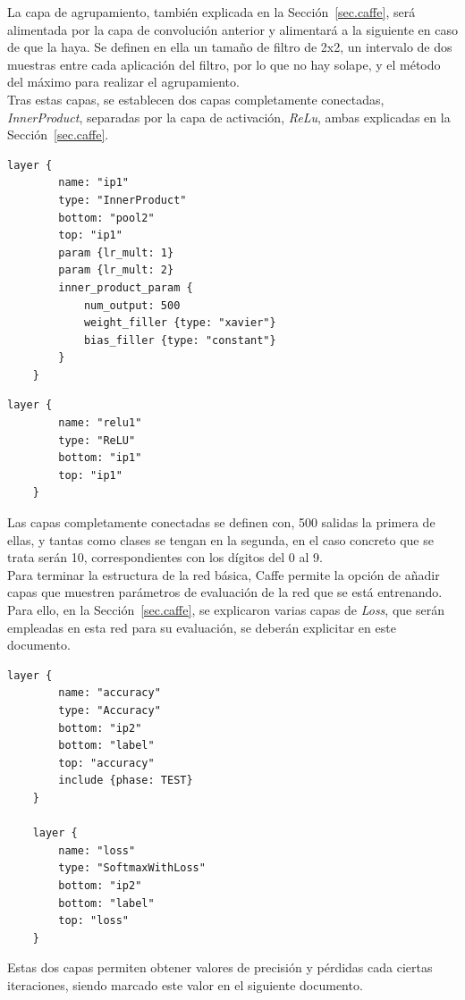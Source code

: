 	La capa de agrupamiento, también explicada en la Sección~\ref{sec.caffe}, será alimentada por la capa de convolución anterior y alimentará a la siguiente en caso de que la haya. Se definen en ella un tamaño de filtro de 2x2, un intervalo de dos muestras entre cada aplicación del filtro, por lo que no hay solape, y el método del máximo para realizar el agrupamiento.\\

	Tras estas capas, se establecen dos capas completamente conectadas, \textit{InnerProduct}, separadas por la capa de activación, \textit{ReLu}, ambas explicadas en la Sección~\ref{sec.caffe}. 
	\vspace{10pt}
	\begin{lstlisting}[frame=single]
	layer {
		name: "ip1"
		type: "InnerProduct"
		bottom: "pool2"
		top: "ip1"
		param {lr_mult: 1}
		param {lr_mult: 2}
		inner_product_param {
			num_output: 500
			weight_filler {type: "xavier"}
			bias_filler {type: "constant"}
		}
	}	
	\end{lstlisting}
	
	\begin{lstlisting}[frame=single]
	layer {
		name: "relu1"
		type: "ReLU"
		bottom: "ip1"
		top: "ip1"
	}	
	\end{lstlisting}
	
	Las capas completamente conectadas se definen con, 500 salidas la primera de ellas, y tantas como clases se tengan en la segunda, en el caso concreto que se trata serán 10, correspondientes con los dígitos del 0 al 9.\\

	Para terminar la estructura de la red básica, Caffe permite la opción de añadir capas que muestren parámetros de evaluación de la red que se está entrenando. Para ello, en la Sección~\ref{sec.caffe}, se explicaron varias capas de \textit{Loss}, que serán empleadas en esta red para su evaluación, se deberán explicitar en este documento.
	\vspace{10pt}
	\begin{lstlisting}[frame=single]
	layer {
		name: "accuracy"
		type: "Accuracy"
		bottom: "ip2"
		bottom: "label"
		top: "accuracy"
		include {phase: TEST}
	}
	
	layer {
		name: "loss"
		type: "SoftmaxWithLoss"
		bottom: "ip2"
		bottom: "label"
		top: "loss"
	}	
	\end{lstlisting}
	
	Estas dos capas permiten obtener valores de precisión y pérdidas cada ciertas iteraciones, siendo marcado este valor en el siguiente documento.\\

